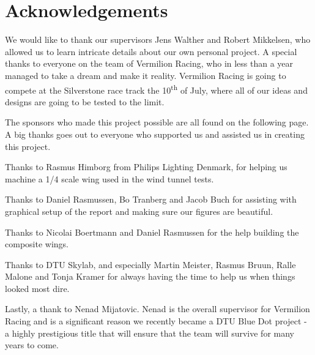 \chapter*{Acknowledgements}

We would like to thank our supervisors Jens Walther and Robert Mikkelsen, who allowed us to learn intricate details about our own personal project. A special thanks to everyone on the team of Vermilion Racing, who in less than a year managed to take a dream and make it reality. Vermilion Racing is going to compete at the Silverstone race track the 10\textsuperscript{th} of July, where all of our ideas and designs are going to be tested to the limit.

The sponsors who made this project possible are all found on the following page. A big thanks goes out to everyone who supported us and assisted us in creating this project.

Thanks to Rasmus Himborg from Philips Lighting Denmark, for helping us machine a 1/4 scale wing used in the wind tunnel tests.

Thanks to Daniel Rasmussen, Bo Tranberg and Jacob Buch for assisting with graphical setup of the report and making sure our figures are beautiful.

Thanks to Nicolai Boertmann and Daniel Rasmussen for the help building the composite wings.

Thanks to DTU Skylab, and especially Martin Meister, Rasmus Bruun, Ralle Malone and Tonja Kramer for always having the time to help us when things looked most dire.

Lastly, a thank to Nenad Mijatovic. Nenad is the overall supervisor for Vermilion Racing and is a significant reason we recently became a DTU Blue Dot project - a highly prestigious title that will ensure that the team will survive for many years to come.

\begin{figure}
  \label{fig:sponsorstack}
\end{figure}
